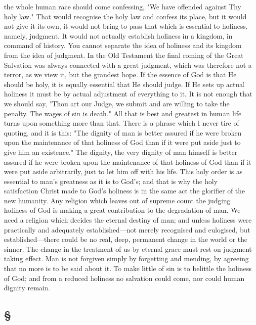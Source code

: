 \documentclass[draft]{ptfdoc}
\begin{document}
the whole human race should come confessing, 
"We have offended against Thy holy law." 
That would recognise the holy law and confess 
its place, but it would not give it its own, it 
would not bring to pass that which is essential 
to holiness, namely, judgment. It would not 
actually establish holiness in a kingdom, in 
command of history. You cannot separate the 
idea of holiness and its kingdom from the idea 
of judgment. In the Old Testament the final 
coming of the Great Salvation was always connected 
with a great judgment, which was 
therefore not a terror, as we view it, but the 
grandest hope. If the essence of God is that He 
should be holy, it is equally essential that He 
should judge. If He sets up actual holiness it 
must be by actual adjustment of everything 
to it. It is not enough that we should say, 
"Thou art our Judge, we submit and are willing 
to take the penalty. The wages of sin is 
death." All that is best and greatest in human 
life turns upon something more than that. 
There is a phrase which I never tire of quoting, 
and it is this: "The dignity of man is better 
assured if he were broken upon the maintenance 
of that holiness of God than if it 
were put aside just to give him an existence." 
The dignity, the very dignity of man himself 
is better assured if he were broken upon the 
maintenance of that holiness of God than if it 
were put aside arbitrarily, just to let him off 
with his life. This holy order is as essential 
to man's greatness as it is to God's; and that is 
why the holy satisfaction Christ made to God's 
holiness is in the same act the glorifier of 
the new humanity. Any religion which leaves 
out of supreme count the judging holiness 
of God is making a great contribution to the 
degradation of man. We need a religion which 
decides the eternal destiny of man; and unless 
holiness were practically and adequately established---not
merely recognised and eulogised, 
but established---there could be no real, deep, 
permanent change in the world or the sinner. 
The change in the treatment of us by eternal 
grace must rest on judgment taking effect. 
Man is not forgiven simply by forgetting and 
mending, by agreeing that no more is to be 
said about it. To make little of sin is to 
belittle the holiness of God; and from a reduced 
holiness no salvation could come, nor 
could human dignity remain. 

\subsection*{
\S
}
\end{document}
